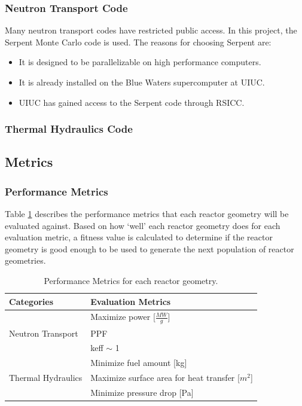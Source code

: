 \subsubsection{Neutron Transport Code}
Many neutron transport codes have restricted public access. 
In this project, the Serpent Monte Carlo code is used. 
The reasons for choosing Serpent are: 
\begin{itemize}
    \item It is designed to be parallelizable on high performance 
    computers. 
    \item It is already installed on the Blue Waters supercomputer at UIUC. 
    \item UIUC has gained access to the Serpent code through RSICC. 
\end{itemize}

\subsubsection{Thermal Hydraulics Code}

\subsection{Metrics}

\subsubsection{Performance Metrics}
Table \ref{tab:eval-metric} describes the performance metrics that each 
reactor geometry will be evaluated against. 
Based on how `well' each reactor geometry does for each evaluation metric, 
a fitness value is calculated to determine if the reactor geometry is good 
enough to be used to generate the next population of reactor geometries. 

\begin{table}[!htbp]
    \caption{Performance Metrics for each reactor geometry.}
    \label{tab:eval-metric}
    \centering
    \doublespacing
    \small
    \begin{tabular}{ll}
    \hline
    \textbf{Categories} & \textbf{Evaluation Metrics}\\ \hline
    & Maximize power [$\frac{MW}{g}$] \\
    Neutron Transport & \gls{PPF} \\ 
    & keff $\sim$ 1 \\ 
    & Minimize fuel amount [kg] \\ \hline
    Thermal Hydraulics & Maximize surface area for heat transfer [$m^2$]\\ 
    & Minimize pressure drop [Pa]\\ \hline 
    \end{tabular}
\end{table}

